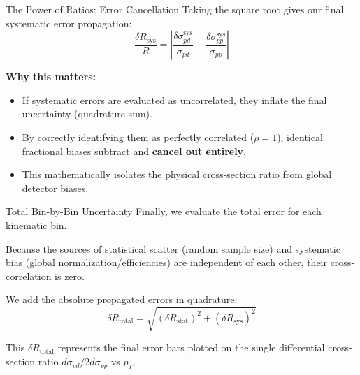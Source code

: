 \documentclass[aspectratio=169]{beamer}
\begin{document}
\begin{frame}{The Power of Ratios: Error Cancellation}
    Taking the square root gives our final systematic error propagation:
    \begin{equation}
        \frac{\delta R_{\text{sys}}}{R} = \left| \frac{\delta \sigma_{pd}^{\text{sys}}}{\sigma_{pd}} - \frac{\delta \sigma_{pp}^{\text{sys}}}{\sigma_{pp}} \right|
    \end{equation}
    
    \vspace{0.3cm}
    \textbf{Why this matters:}
    \begin{itemize}
        \setlength{\itemsep}{0.2cm}
        \item If systematic errors are evaluated as uncorrelated, they inflate the final uncertainty (quadrature sum).
        \item By correctly identifying them as perfectly correlated ($\rho=1$), identical fractional biases subtract and \textbf{cancel out entirely}.
        \item This mathematically isolates the physical cross-section ratio from global detector biases.
    \end{itemize}
\end{frame}

\begin{frame}{Total Bin-by-Bin Uncertainty}
    Finally, we evaluate the total error for each kinematic bin.
    \vspace{0.3cm}
    
    Because the sources of statistical scatter (random sample size) and systematic bias (global normalization/efficiencies) are independent of each other, their cross-correlation is zero.
    
    \vspace{0.3cm}
    We add the absolute propagated errors in quadrature:
    \begin{equation}
        \delta R_{\text{total}} = \sqrt{(\delta R_{\text{stat}})^2 + (\delta R_{\text{sys}})^2}
    \end{equation}
    
    \vspace{0.3cm}
    This $\delta R_{\text{total}}$ represents the final error bars plotted on the single differential cross-section ratio $d\sigma_{pd} / 2d\sigma_{pp}$ vs $p_T$.
\end{frame}
\end{document}
